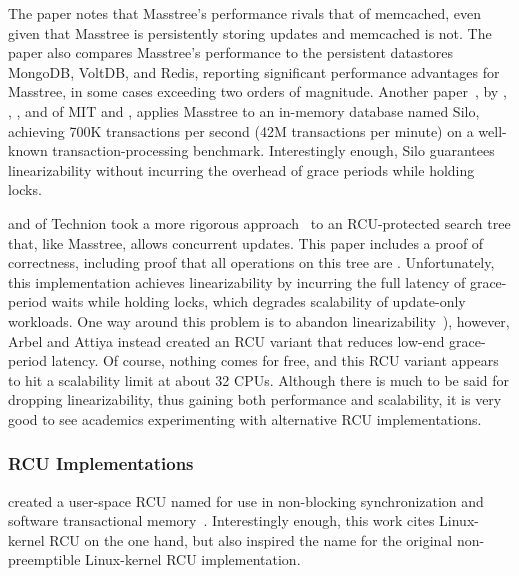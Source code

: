 The paper notes that Masstree's performance rivals that of memcached, even
given that Masstree is persistently storing updates and memcached is not.
The paper also compares Masstree's performance to the persistent
datastores MongoDB, VoltDB, and Redis, reporting significant performance
advantages for Masstree, in some cases exceeding two orders of magnitude.
Another paper~\cite{Tu:2013:STM:2517349.2522713}, by ,
, , and 
of MIT and ,
applies Masstree to an in-memory database named Silo, achieving 700K
transactions per second (42M transactions per minute) on a well-known
transaction-processing benchmark.
Interestingly enough, Silo guarantees linearizability without incurring
the overhead of grace periods while holding locks.

 and  of Technion took a more rigorous
approach~\cite{MayaArbel2014RCUtree} to an RCU-protected search tree that,
like Masstree, allows concurrent updates.
This paper includes a proof of correctness, including proof that all
operations on this tree are .
Unfortunately, this implementation achieves linearizability by incurring
the full latency of grace-period waits while holding locks, which degrades
scalability of update-only workloads.
One way around this problem is to abandon
linearizability~\cite{AndreasHaas2012FIFOisnt,PaulEMcKennneyAtomicTreeN4037}),
however, Arbel and Attiya instead created an RCU variant that reduces
low-end grace-period latency.
Of course, nothing comes for free, and this RCU variant appears to hit
a scalability limit at about 32 CPUs.
Although there is much to be said for dropping linearizability, thus
gaining both performance and scalability, it is very good to see academics
experimenting with alternative RCU implementations.

\subsubsection{RCU Implementations}
\label{sec:defer:RCU Implementations}

 created a user-space RCU named  for use in
non-blocking synchronization and software transactional
memory~\cite{KeirAnthonyFraserPhD,UCAM-CL-TR-579,KeirFraser2007withoutLocks}.
Interestingly enough, this work cites Linux-kernel RCU on the one hand,
but also inspired the name  for the original non-preemptible
Linux-kernel RCU implementation.

